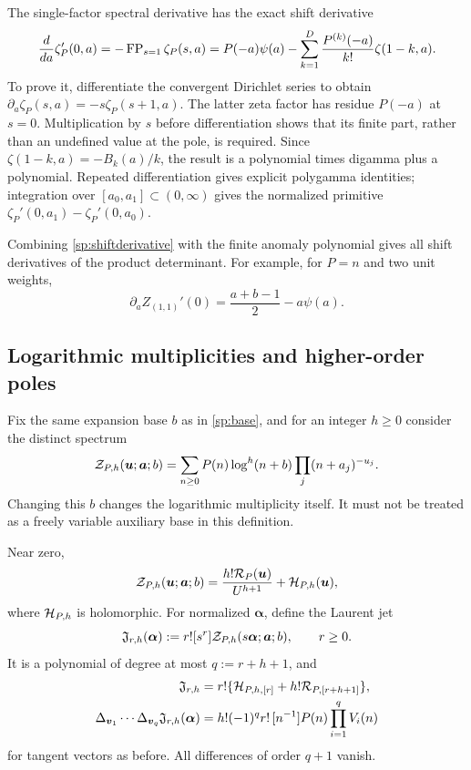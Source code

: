 The single-factor spectral derivative has the exact shift derivative
\begin{equation}\label{sp:shiftderivative}
 \frac{d}{da}\zeta_P'(0,a)
  =-\operatorname{FP}_{s=1}\zeta_P(s,a)
  =P(-a)\psi(a)
      -\sum_{k=1}^D\frac{P^{(k)}(-a)}{k!}\zeta(1-k,a).
\end{equation}
To prove it, differentiate the convergent Dirichlet series to obtain
$\partial_a\zeta_P(s,a)=-s\zeta_P(s+1,a)$. The latter zeta factor
has residue $P(-a)$ at $s=0$. Multiplication by $s$ before
differentiation shows that its finite part, rather than an undefined
value at the pole, is required. Since
$\zeta(1-k,a)=-B_k(a)/k$, the result is a polynomial times digamma
plus a polynomial. Repeated differentiation gives explicit polygamma
identities; integration over $[a_0,a_1]\subset(0,\infty)$ gives the
normalized primitive $\zeta_P'(0,a_1)-\zeta_P'(0,a_0)$.

Combining \eqref{sp:shiftderivative} with the finite anomaly polynomial
gives all shift derivatives of the product determinant. For example,
for $P=n$ and two unit weights,
\[
 \partial_a Z_{(1,1)}'(0)=\frac{a+b-1}2-a\psi(a).
\]

\subsection{Logarithmic multiplicities and higher-order poles}

Fix the same expansion base $b$ as in \eqref{sp:base}, and for an
integer $h\ge0$ consider the distinct spectrum
\begin{equation}\label{sp:logdef}
 \mathcal Z_{P,h}(\boldsymbol u;\boldsymbol a;b)
  =\sum_{n\ge0}P(n)\log^h(n+b)\prod_j(n+a_j)^{-u_j}.
\end{equation}
Changing this $b$ changes the logarithmic multiplicity itself.
It must not be treated as a freely variable auxiliary base in this
definition.

\begin{theorem}
\label{sp:thm:log}
Near zero,
\begin{equation}\label{sp:loggerm}
 \mathcal Z_{P,h}(\boldsymbol u;\boldsymbol a;b)
   =\frac{h!\mathcal R_P(\boldsymbol u)}{U^{h+1}}
                                +\mathcal H_{P,h}(\boldsymbol u),
\end{equation}
where $\mathcal H_{P,h}$ is holomorphic. For normalized $\boldsymbol\alpha$,
define the Laurent jet
\begin{equation}\label{sp:logjet}
 \mathfrak J_{r,h}(\boldsymbol\alpha)
  :=r![s^r]\mathcal Z_{P,h}(s\boldsymbol\alpha;\boldsymbol a;b),
 \qquad r\ge0.
\end{equation}
It is a polynomial of degree at most $q:=r+h+1$, and
\begin{align}
 \mathfrak J_{r,h}
   &=r!\{\mathcal H_{P,h,[r]}+h!\mathcal R_{P,[r+h+1]}\},\label{sp:loghomogeneous}\\
 \Delta_{\boldsymbol v_1}\cdots\Delta_{\boldsymbol v_q}
       \mathfrak J_{r,h}(\boldsymbol\alpha)
   &=h!(-1)^q r!\,[n^{-1}]P(n)\prod_{i=1}^q V_i(n)
 \label{sp:logdifference}
\end{align}
for tangent vectors as before. All differences of order $q+1$ vanish.
\end{theorem}


